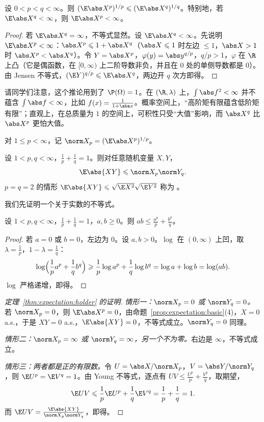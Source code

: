 \begin{corollary}[矩的单调性]\label{cor:expectation:lyapunov}
设 $0<p<q<\infty$。则 $(\E\abs X^p)^{1/p}\leqslant(\E\abs X^q)^{1/q}$。特别地，若 $\E\abs X^q<\infty$，则 $\E\abs X^p<\infty$。
\end{corollary}
\begin{proof}
若 $\E\abs X^q=\infty$，不等式显然。设 $\E\abs X^q<\infty$。先说明 $\E\abs X^p<\infty$：$\abs X^p\leqslant1+\abs X^q$（$\abs X\leqslant1$ 时左边 $\leqslant1$，$\abs X>1$ 时 $\abs X^p<\abs X^q$）。令 $Y=\abs X^p$，$\varphi(y)=\abs y^{q/p}$，$q/p>1$，$\varphi$ 在 $\R$ 上凸（它是偶函数，在 $[0,\infty)$ 上二阶导数非负，并且在 $0$ 处的单侧导数都是 $0$）。由 Jensen 不等式，$(\E Y)^{q/p}\leqslant \E\abs X^q$，两边开 $q$ 次方即得。
\end{proof}

请同学们注意，这个推论用到了 $\P(\Omega)=1$。在 $(\R,\lambda)$ 上，$\int\abs f^2<\infty$ 并不蕴含 $\int\abs f<\infty$，比如 $f(x)=\frac1{1+\abs x}$。概率空间上，“高阶矩有限蕴含低阶矩有限”；直观上，在总质量为 $1$ 的空间上，可积性只受“大值”影响，而 $\abs X^q$ 比 $\abs X^p$ 更怕大值。


对 $1\leqslant p<\infty$，记 $\norm X_p=(\E\abs X^p)^{1/p}$。

\begin{theorem}\label{thm:expectation:holder}
设 $1<p,q<\infty$，$\frac1p+\frac1q=1$。则对任意随机变量 $X,Y$，
\[
\E\abs{XY}\leqslant\norm X_p\norm Y_q .
\]
$p=q=2$ 的情形 $\E\abs{XY}\leqslant\sqrt{\E X^2}\sqrt{\E Y^2}$ 称为 。
\end{theorem}

我们先证明一个关于实数的不等式。

\begin{lemma}\label{lem:expectation:young}
设 $1<p,q<\infty$，$\frac1p+\frac1q=1$，$a,b\geqslant0$。则 $ab\leqslant\frac{a^p}p+\frac{b^q}q$。
\end{lemma}
\begin{proof}
若 $a=0$ 或 $b=0$，左边为 $0$。设 $a,b>0$。$\log$ 在 $(0,\infty)$ 上凹，取 $\lambda=\frac1p$，$1-\lambda=\frac1q$：
\[
\log\Bigl(\frac1pa^p+\frac1qb^q\Bigr)\geqslant\frac1p\log a^p+\frac1q\log b^q=\log a+\log b=\log(ab).
\]
$\log$ 严格递增，即得。
\end{proof}

\begin{proof}[定理~\ref{thm:expectation:holder} 的证明]
\emph{情形一：$\norm X_p=0$ 或 $\norm Y_q=0$。}若 $\norm X_p=0$，则 $\E\abs X^p=0$，由命题~\ref{prop:expectation:basic}(4)，$X=0$ a.s.，于是 $XY=0$ a.s.，$\E\abs{XY}=0$，不等式成立。$\norm Y_q=0$ 同理。

\emph{情形二：$\norm X_p=\infty$ 或 $\norm Y_q=\infty$，另一个不为零。}右边是 $\infty$，不等式成立。

\emph{情形三：两者都是正的有限数。}令 $U=\abs X/\norm X_p$，$V=\abs Y/\norm Y_q$，则 $\E U^p=\E V^q=1$。由 Young 不等式，逐点有 $UV\leqslant\frac{U^p}p+\frac{V^q}q$，取期望，
\[
\E UV\leqslant\frac1p\E U^p+\frac1q\E V^q=\frac1p+\frac1q=1 .
\]
而 $\E UV=\frac{\E\abs{XY}}{\norm X_p\norm Y_q}$，即得。
\end{proof}

